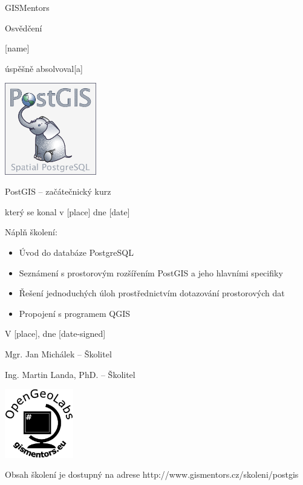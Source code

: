 \documentclass[12pt, a4paper]{letter}
\begin{document}
\pagestyle{empty}
\begin{center}

{\Large GISMentors}

{\Huge Osvědčení}

{\Large [name]}

úspěšně absolvoval[a]

\includegraphics[width=0.30\textwidth]{../images/postgis.png}

{\Large PostGIS -- začátečnický kurz}

který se konal v [place] dne [date]
\end{center}

Náplň školení:

\begin{itemize}
    \item Úvod do databáze PostgreSQL
    \item Seznámení s prostorovým rozšířením PostGIS a jeho hlavními specifiky
    \item Řešení jednoduchých úloh prostřednictvím dotazování prostorových dat
    \item Propojení s programem QGIS
\end{itemize}

\vfill
\parbox{7cm}{

    V [place], dne [date-signed]\\

\vfill

    Mgr. Jan Michálek -- Školitel \\

\vfill

    Ing. Martin Landa, PhD. -- Školitel
}
\hfill
\parbox{3cm}{
    \includegraphics[width=3cm]{../images/placka.eps}
}

\vfill

\begin{center}
{\footnotesize Obsah školení je dostupný na adrese
http://www.gismentors.cz/skoleni/postgis}
\end{center}
\end{document}
